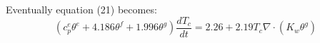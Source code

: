 Eventually equation (21) becomes:
\begin{equation}
(c_p^e \theta^e + 4.186 \theta^f + 1.996 \theta^g) \frac{dT_c}{dt} = 2.26 + 2.19 T_c \nabla \cdot ( K_w  \theta^g)
\end{equation}